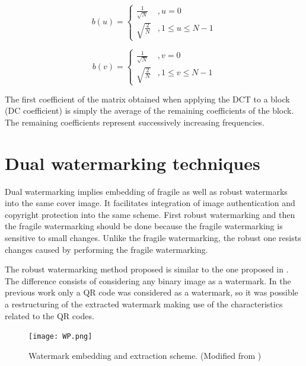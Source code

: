 \documentclass[runningheads]{llncs}
\begin{document}
\begin{equation}
b(u)=\begin{cases}
\frac{1}{\sqrt{N}} & ,u=0\\
\sqrt{\frac{2}{N}} & ,1\leq u\leq N-1
\end{cases}
\end{equation}

\begin{equation}
b(v)=\begin{cases}
\frac{1}{\sqrt{N}} & ,v=0\\
\sqrt{\frac{2}{N}} & ,1\leq v\leq N-1
\end{cases}
\end{equation}

The first coefficient of the matrix obtained when applying the DCT to a block (DC coefficient) is simply the average of the remaining coefficients of the block. The remaining coefficients represent successively increasing frequencies.

\section{Dual watermarking techniques}
Dual watermarking implies embedding of fragile as well as robust watermarks into the same cover image. It facilitates integration of image authentication and copyright protection into the same scheme. First robust watermarking and then the fragile watermarking should be done because the fragile watermarking is sensitive to small changes. Unlike the fragile watermarking, the robust one resists changes caused by performing the fragile watermarking.

The robust watermarking method proposed is similar to the one proposed in \cite{avila2018watermarking}. The difference consists of considering any binary image as a watermark. In the previous work only a QR code was considered as a watermark, so it was possible a restructuring of the extracted watermark making use of the characteristics related to the QR codes.
\begin{figure}
	\begin{center}
		\texttt{[image: WP.png]}
	\end{center}
	\caption{Watermark embedding and extraction scheme. (Modified from \cite{avila2018watermarking})}
	\label{PIE}
\end{figure}
\end{document}
